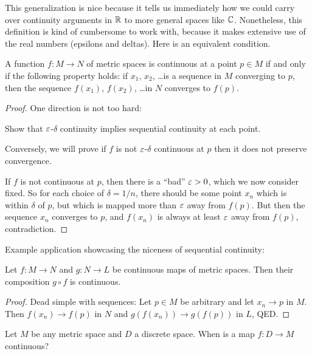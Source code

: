 This generalization is nice because it tells us immediately how we could carry over continuity arguments in $\mathbb R$ to more general spaces like $\mathbb C$.
Nonetheless, this definition is kind of cumbersome to work with,
because it makes extensive use of the real numbers
(epsilons and deltas).
Here is an equivalent condition.
\begin{theorem}
	\label{thm:seq_cont}
	A function $f \colon M \to N$ of metric spaces
	is continuous at a point $p \in M$
	if and only if the following property holds:
	if $x_1$, $x_2$, \dots is a sequence in $M$ converging to $p$,
	then the sequence $f(x_1)$, $f(x_2)$, \dots in $N$ converges to $f(p)$.
\end{theorem}
\begin{proof}
	One direction is not too hard:
	\begin{exercise}
		Show that $\varepsilon$-$\delta$ continuity implies sequential continuity
		at each point.
	\end{exercise}
	Conversely, we will prove if $f$ is not $\varepsilon$-$\delta$ continuous at $p$
	then it does not preserve convergence.

	If $f$ is not continuous at $p$, then there is a ``bad'' $\varepsilon > 0$,
	which we now consider fixed.
	So for each choice of $\delta = 1/n$,
	there should be some point $x_n$ which is within $\delta$ of $p$,
	but which is mapped more than $\varepsilon$ away from $f(p)$.
	But then the sequence $x_n$ converges to $p$,
	and $f(x_n)$ is always at least $\varepsilon$ away from $f(p)$, contradiction.
\end{proof}

Example application showcasing the niceness of sequential continuity:
\begin{proposition}
	Let $f \colon M \to N$ and $g \colon N \to L$ be continuous maps of metric spaces.
	Then their composition $g \circ f$ is continuous.
\end{proposition}
\begin{proof}
	Dead simple with sequences:
	Let $p \in M$ be arbitrary and let $x_n \to p$ in $M$.
	Then $f(x_n) \to f(p)$ in $N$ and $g(f(x_n)) \to g(f(p))$ in $L$, QED.
\end{proof}

\begin{ques}
	Let $M$ be any metric space and $D$ a discrete space.
	When is a map $f \colon D \to M$ continuous?
\end{ques}




